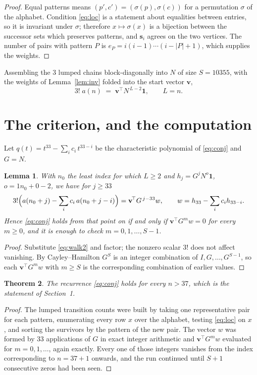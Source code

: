 \documentclass[11pt,a4paper]{article}
\theoremstyle{plain}
\newtheorem{theorem}{Theorem}
\newtheorem{lemma}[theorem]{Lemma}
\theoremstyle{definition}
\begin{document}
\begin{proof}
Equal patterns means $(p',c')=(\sigma(p),\sigma(c))$ for a permutation $\sigma$ of the
alphabet. Condition \eqref{eq:loc} is a statement about equalities between entries, so it is
invariant under $\sigma$; therefore $x\mapsto\sigma(x)$ is a bijection between the successor
sets which preserves patterns, and $\mathbf{s}_i$ agrees on the two vertices. The number of
pairs with pattern $P$ is $e_P=i(i-1)\cdots(i-|P|+1)$, which supplies the weights.
\end{proof}

Assembling the $3$ lumped chains block-diagonally into $N$ of size $S=10355$, with the
weights of Lemma~\ref{lem:inv} folded into the start vector $\mathbf{v}$,
\begin{equation}\label{eq:walk2}
3!\;a(n)\;=\;\mathbf{v}^{\!\top}N^{\,L-2}\mathbf{1},\qquad L=n .
\end{equation}

\section{The criterion, and the computation}

Let $q(t)=t^{33}-\sum_i c_i\,t^{33-i}$ be the characteristic polynomial of
\eqref{eq:conj} and $G=N$.

\begin{lemma}\label{lem:crit}
With $n_0$ the least index for which $L\ge2$ and $h_j=G^{j}N^{o}\mathbf{1}$,
$o=1n_0+0-2$, we have for $j\ge33$
\[
3!\Bigl(a(n_0+j)-\sum_i c_i\,a(n_0+j-i)\Bigr)
=\mathbf{v}^{\!\top}G^{\,j-33}w,\qquad
w=h_{33}-\sum_i c_i h_{33-i} .
\]
Hence \eqref{eq:conj} holds from that point on if and only if
$\mathbf{v}^{\!\top}G^{m}w=0$ for every $m\ge0$, and it is enough to check
$m=0,1,\dots,S-1$.
\end{lemma}

\begin{proof}
Substitute \eqref{eq:walk2} and factor; the nonzero scalar $3!$ does not affect
vanishing. By Cayley--Hamilton $G^{S}$ is an integer combination of $I,G,\dots,G^{S-1}$,
so each $\mathbf{v}^{\!\top}G^{m}w$ with $m\ge S$ is the corresponding combination of
earlier values.
\end{proof}

\begin{theorem}
The recurrence \eqref{eq:conj} holds for every $n>37$, which is the statement of
Section~1.
\end{theorem}

\begin{proof}
The lumped transition counts were built by taking one representative pair for each pattern,
enumerating every row $x$ over the alphabet, testing \eqref{eq:loc} on $x$, and sorting
the survivors by the pattern of the new pair. The vector $w$ was formed by $33$
applications of $G$ in exact integer arithmetic and $\mathbf{v}^{\!\top}G^{m}w$
evaluated for $m=0,1,\dots$, again exactly. Every one of those integers vanishes from the
index corresponding to $n=37+1$ onwards, and the run continued until $S+1$ consecutive
zeros had been seen.
\end{proof}
\end{document}
